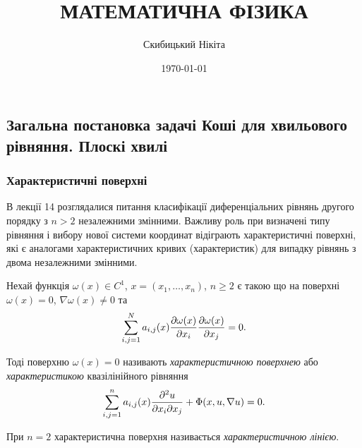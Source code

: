 

\title{{\Huge МАТЕМАТИЧНА ФІЗИКА}}
\author{Скибицький Нікіта}
\date{\today}





\tableofcontents

\setcounter{section}{3}
\setcounter{subsection}{8}

\subsection{Загальна постановка задачі Коші для хвильового рівняння. Плоскі хвилі}

\subsubsection{Характеристичні поверхні}

В лекції 14 розглядалися питання класифікації диференціальних рівнянь другого порядку з $n > 2$ незалежними змінними. Важливу роль при визначені типу рівняння і вибору нової системи координат відіграють характеристичні поверхні, які є аналогами характеристичних кривих (характеристик) для випадку рівнянь з двома незалежними змінними. \medskip

Нехай функція $\omega(x) \in C^1$, $x = (x_1, \ldots, x_n)$, $n \ge 2$ є такою що на поверхні $\omega(x) = 0$, $\nabla \omega(x) \ne 0$ та
\begin{equation}
    \label{eq:omega-partial-system-of-linear-equations}
    \displaystyle\sum\limits_{i, j = 1}^N a_{i,j}(x) \frac{\partial \omega(x)}{\partial x_i} \frac{\partial \omega(x)}{\partial x_j} = 0.
\end{equation}

\begin{definition}
    Тоді поверхню $\omega(x) = 0$ називають \textit{характеристичною поверхнею} або \textit{характеристикою} квазілінійного рівняння
    \begin{equation}
        \displaystyle\sum\limits_{i, j = 1}^n a_{i, j}(x) \frac{\partial^2 u}{\partial x_i \partial x_j} + \Phi(x, u, \nabla u) = 0.
    \end{equation}
\end{definition}

\begin{definition}
    При $n = 2$ характеристична поверхня називається \textit{характеристичною лінією}.
\end{definition}

